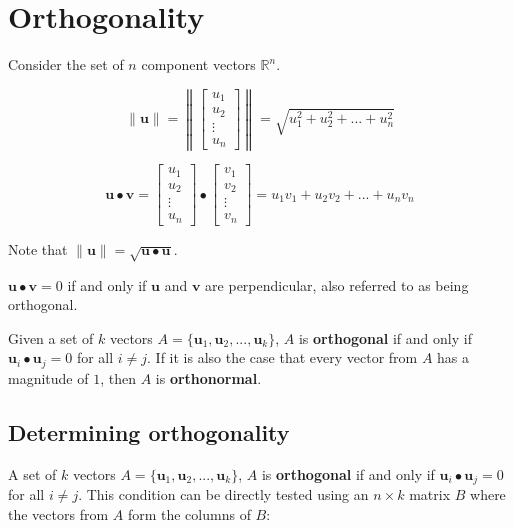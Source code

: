 \documentclass{article}
\begin{document}
\section*{Orthogonality}

Consider the set of \(n\) component vectors \(\mathbb{R}^n\). 

\[\|\mathbf{u}\| = \left\|\begin{bmatrix} u_1 \\ u_2 \\ \vdots \\ u_n \end{bmatrix}\right\| = \sqrt{u_1^2 + u_2^2 + ... + u_n^2}\]

\[\mathbf{u} \bullet \mathbf{v} = \begin{bmatrix} u_1 \\ u_2 \\ \vdots \\ u_n \end{bmatrix} \bullet \begin{bmatrix} v_1 \\ v_2 \\ \vdots \\ v_n \end{bmatrix} = u_1 v_1 + u_2 v_2 + ... + u_n v_n\]

Note that \(\|\mathbf{u}\| = \sqrt{\mathbf{u} \bullet \mathbf{u}}\). 

\(\mathbf{u} \bullet \mathbf{v} = 0\) if and only if \(\mathbf{u}\) and \(\mathbf{v}\) are perpendicular, also referred to as being orthogonal.

Given a set of \(k\) vectors \(A = \{\mathbf{u}_1, \mathbf{u}_2, ..., \mathbf{u}_k\}\), \(A\) is {\bf orthogonal} if and only if \(\mathbf{u}_i \bullet \mathbf{u}_j = 0\) for all \(i \neq j\). If it is also the case that every vector from \(A\) has a magnitude of \(1\), then \(A\) is {\bf orthonormal}.



\subsection*{Determining orthogonality}

A set of \(k\) vectors \(A = \{\mathbf{u}_1, \mathbf{u}_2, ..., \mathbf{u}_k\}\), \(A\) is {\bf orthogonal} if and only if \(\mathbf{u}_i \bullet \mathbf{u}_j = 0\) for all \(i \neq j\). This condition can be directly tested using an \(n \times k\) matrix \(B\) where the vectors from \(A\) form the columns of \(B\):
\end{document}
